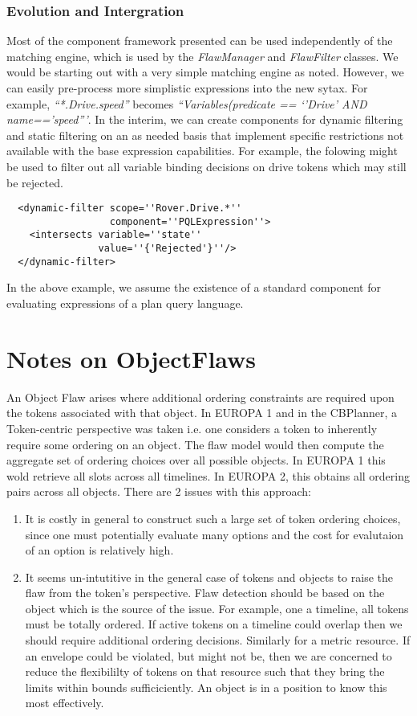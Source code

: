\documentclass[10pt, letterpaper, oneside]{article}
\begin{document}
\subsubsection{Evolution and Intergration}
Most of the component framework presented can be used independently of the matching engine, which is used by the {\em FlawManager} and {\em FlawFilter} classes. We would be starting out with a very simple matching engine as noted. However, we can easily pre-process more simplistic expressions into the new sytax. For example, {\em ``*.Drive.speed''} becomes {\em ``Variables(predicate == `'Drive' AND name=='speed'''}. In the interim, we can create components for dynamic filtering and static filtering on an as needed basis that implement specific restrictions not available with the base expression capabilities. For example, the folowing might be used to filter out all variable binding decisions on drive tokens which may still be rejected.
\begin{verbatim}
  <dynamic-filter scope=''Rover.Drive.*'' 
                  component=''PQLExpression''>
    <intersects variable=''state'' 
                value=''{'Rejected'}''/>
  </dynamic-filter>
\end{verbatim}

In the above example, we assume the existence of a standard component for evaluating expressions of a plan query language.

\section{Notes on ObjectFlaws}
An Object Flaw arises where additional ordering constraints are required upon the tokens associated with that object. In EUROPA 1 and in the CBPlanner, a Token-centric perspective was taken i.e. one considers a token to inherently require some ordering on an object. The flaw model would then compute the aggregate set of ordering choices over all possible objects. In EUROPA 1 this wold retrieve all slots across all timelines. In EUROPA 2, this obtains all ordering pairs across all objects. There are 2 issues with this approach:
\begin{enumerate}
\item It is costly in general to construct such a large set of token ordering choices, since one must potentially evaluate many options and the cost for evalutaion of an option is relatively high.
\item It seems un-intutitive in the general case of tokens and objects to raise the flaw from the token's perspective. Flaw detection should be based on the object which is the source of the issue. For example, one a timeline, all tokens must be totally ordered. If active tokens on a timeline could overlap then we should require additional ordering decisions. Similarly for a metric resource. If an envelope could be violated, but might not be, then we are concerned to reduce the flexibililty of tokens on that resource such that they bring the limits within bounds sufficiciently. An object is in a position to know this most effectively.
\end{enumerate}
\end{document}
